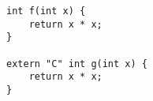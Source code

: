 \begin{lstlisting}[title=\href{https://godbolt.org/z/87z8vz}{\texttt{godbolt.org/z/87z8vz}}]
int f(int x) {
    return x * x;
}

extern "C" int g(int x) {
    return x * x;
}
\end{lstlisting}
